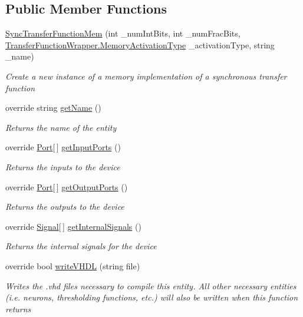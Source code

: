 \subsection*{Public Member Functions}
\begin{DoxyCompactItemize}
\item 
\hyperlink{class_n_n_gen_1_1_sync_transfer_function_mem_ad19b1fb77caa8199d378760b7472f950}{Sync\+Transfer\+Function\+Mem} (int \+\_\+num\+Int\+Bits, int \+\_\+num\+Frac\+Bits, \hyperlink{class_n_n_gen_1_1_transfer_function_wrapper_aa338ffadb8fcdf76df75419374a51ff6}{Transfer\+Function\+Wrapper.\+Memory\+Activation\+Type} \+\_\+activation\+Type, string \+\_\+name)
\begin{DoxyCompactList}\small\item\em Create a new instance of a memory implementation of a synchronous transfer function \end{DoxyCompactList}\item 
override string \hyperlink{class_n_n_gen_1_1_sync_transfer_function_mem_ad4e64419e06ee98cd0a8e52d7ed866b6}{get\+Name} ()
\begin{DoxyCompactList}\small\item\em Returns the name of the entity \end{DoxyCompactList}\item 
override \hyperlink{class_n_n_gen_1_1_port}{Port}\mbox{[}$\,$\mbox{]} \hyperlink{class_n_n_gen_1_1_sync_transfer_function_mem_a4e263ba9743751277b49cd90578e2455}{get\+Input\+Ports} ()
\begin{DoxyCompactList}\small\item\em Returns the inputs to the device \end{DoxyCompactList}\item 
override \hyperlink{class_n_n_gen_1_1_port}{Port}\mbox{[}$\,$\mbox{]} \hyperlink{class_n_n_gen_1_1_sync_transfer_function_mem_a56548ab0fbafaa0384aa3c5cddc4d050}{get\+Output\+Ports} ()
\begin{DoxyCompactList}\small\item\em Returns the outputs to the device \end{DoxyCompactList}\item 
override \hyperlink{class_n_n_gen_1_1_signal}{Signal}\mbox{[}$\,$\mbox{]} \hyperlink{class_n_n_gen_1_1_sync_transfer_function_mem_a6b11efb6fd2d874b9bb5cfaafdb528a5}{get\+Internal\+Signals} ()
\begin{DoxyCompactList}\small\item\em Returns the internal signals for the device \end{DoxyCompactList}\item 
override bool \hyperlink{class_n_n_gen_1_1_sync_transfer_function_mem_a6262571443276194d157c94be915f069}{write\+V\+H\+D\+L} (string file)
\begin{DoxyCompactList}\small\item\em Writes the .vhd files necessary to compile this entity. All other necessary entities (i.\+e. neurons, thresholding functions, etc.) will also be written when this function returns \end{DoxyCompactList}\end{DoxyCompactItemize}
